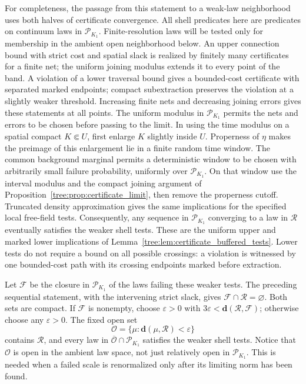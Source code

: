 For completeness, the passage from this statement to a weak-law
neighborhood uses both halves of certificate convergence.
All shell predicates here are predicates on continuum laws
in $\mathcal P_{K_1}$.  Finite-resolution laws will be tested
only for membership in the ambient open neighborhood below.
An upper connection bound with strict cost and spatial slack
is realized by finitely many certificates for a finite net;
the uniform joining modulus extends it to every point of the
band.  A violation of a lower traversal bound gives a
bounded-cost certificate with separated marked endpoints;
compact subextraction preserves the violation at a slightly
weaker threshold.  Increasing finite nets and decreasing
joining errors gives these statements at all points.  The
uniform modulus in $\mathcal P_{K_1}$ permits the nets and
errors to be chosen before passing to the limit.  In using
the time modulus on a spatial compact $K\Subset U$, first
enlarge $K$ slightly inside $U$.  Properness of $\eta$ makes
the preimage of this enlargement lie in a finite random
time window.  The common background marginal permits a
deterministic window to be chosen with arbitrarily small
failure probability, uniformly over $\mathcal P_{K_1}$.
On that window use the interval modulus and the compact
joining argument of Proposition~\ref{tree:prop:certificate_limit},
then remove the properness cutoff.  Truncated
density approximation gives the same implications for the
specified local free-field tests.  Consequently, any sequence
in $\mathcal P_{K_1}$ converging to a law in $\mathcal R$
eventually satisfies the weaker shell tests.
These are the uniform upper and marked lower implications of
Lemma~\ref{tree:lem:certificate_buffered_tests}.  Lower tests do
not require a bound on all possible crossings: a violation
is witnessed by one bounded-cost path with its crossing
endpoints marked before extraction.

Let $\mathcal F$ be the closure in $\mathcal P_{K_1}$ of the
laws failing these weaker tests.  The preceding sequential
statement, with the intervening strict slack, gives
$\mathcal F\cap\mathcal R=\varnothing$.  Both sets are compact.
If $\mathcal F$ is nonempty, choose $\varepsilon>0$ with
$3\varepsilon<\mathbf d(\mathcal R,\mathcal F)$; otherwise
choose any $\varepsilon>0$.  The fixed open set
\begin{equation}
 \mathcal O=\{\mu:\mathbf d(\mu,\mathcal R)<\varepsilon\}
 \label{tree:eq:bootstrap_success_neighborhood}
\end{equation}
contains $\mathcal R$, and every law in
$\overline{\mathcal O}\cap\mathcal P_{K_1}$ satisfies the
weaker shell tests.  Notice that $\mathcal O$ is open in the
ambient law space, not just relatively open in
$\mathcal P_{K_1}$.  This is needed when a failed scale is
renormalized only after its limiting norm has been found.

